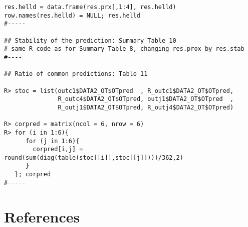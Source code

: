 \begin{verbatim}
res.helld = data.frame(res.prx[,1:4], res.helld)
row.names(res.helld) = NULL; res.helld
#-----

## Stability of the prediction: Summary Table 10 
# same R code as for Summary Table 8, changing res.prox by res.stab
#----

## Ratio of common predictions: Table 11

R> stoc = list(outc1$DATA2_OT$OTpred  , R_outc1$DATA2_OT$OTpred,
               R_outc4$DATA2_OT$OTpred, outj1$DATA2_OT$OTpred  ,
               R_outj1$DATA2_OT$OTpred, R_outj4$DATA2_OT$OTpred)

R> corpred = matrix(ncol = 6, nrow = 6)
R> for (i in 1:6){
      for (j in 1:6){
        corpred[i,j] = round(sum(diag(table(stoc[[i]],stoc[[j]])))/362,2)
      }
   }; corpred
#-----
\end{verbatim}

\hypertarget{references}{%
\section*{References}\label{references}}

